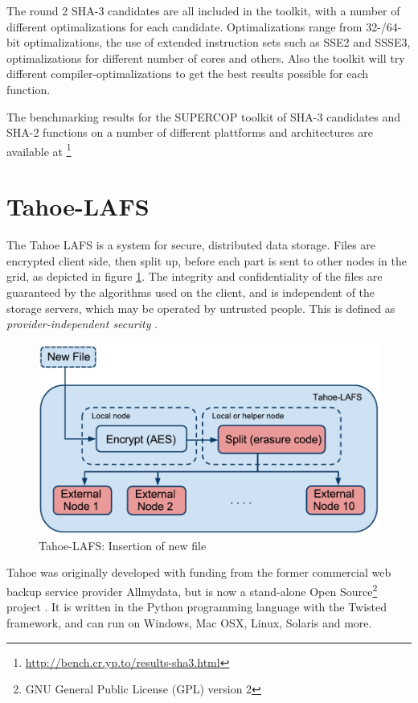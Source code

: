 \documentclass[english,12pt,a4paper]{book}
\begin{document}
The round 2 \ac{SHA}-3 candidates are all included in the toolkit, with a
number of different optimalizations for each candidate. Optimalizations range
from 32-/64-bit optimalizations, the use of extended instruction sets such as
\ac{SSE2} and \ac{SSSE3}, optimalizations for different number of cores and
others. Also the toolkit will try different compiler-optimalizations to get the
best results possible for each function.

The benchmarking results for the \ac{SUPERCOP} toolkit of \ac{SHA}-3 candidates
and \ac{SHA}-2 functions on a number of different plattforms and architectures 
are available at
\footnote{\url{http://bench.cr.yp.to/results-sha3.html}}

\section{Tahoe-LAFS}

The Tahoe \ac{LAFS} is a system for secure,
distributed data storage. Files are encrypted client side, then
split up, before each part is sent to other nodes in the grid, as depicted in
figure \ref{fig:tahoeinsertion}. The integrity and confidentiality of the files
are guaranteed by the algorithms used on the client, and is independent of the
storage servers, which may be operated by untrusted people. This is defined as
\emph{provider-independent security} \cite{t_tahoe}.

\begin{figure}[h!]
    \centering
    \includegraphics[width=0.9\columnwidth]{Tahoe-newfile.pdf}
    \caption{Tahoe-LAFS: Insertion of new file}
    \label{fig:tahoeinsertion}
\end{figure}

Tahoe was originally developed with funding from the former commercial web
backup service provider Allmydata, but is now a stand-alone Open
Source\footnote{GNU General Public License (GPL) version 2} project
\cite{t_ars}.  It is written in the Python programming language with the Twisted
framework, and can run on Windows, Mac OSX, Linux, Solaris and more.
\end{document}
